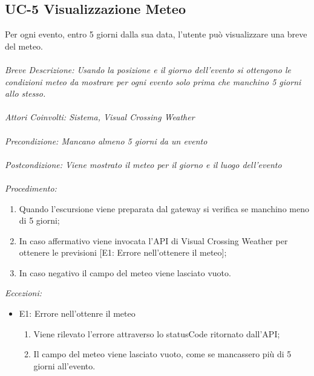 \subsection{UC-5 Visualizzazione Meteo}
Per ogni evento, entro 5 giorni dalla sua data, l'utente può visualizzare una breve del meteo.
\\
\\
\textit{Breve Descrizione: Usando la posizione e il giorno dell'evento si ottengono le condizioni meteo da mostrare per ogni evento solo prima che manchino 5 giorni allo stesso.} 
\\
\\
\textit{Attori Coinvolti: Sistema, Visual Crossing Weather}
\\
\\
\textit{Precondizione: Mancano almeno 5 giorni da un evento}
\\
\\
\textit{Postcondizione: Viene mostrato il meteo per il giorno e il luogo dell'evento}
\\
\\
\textit{Procedimento:}
\begin{enumerate}
	\item Quando l'escursione viene preparata dal gateway si verifica se manchino meno di 5 giorni;
	\item In caso affermativo viene invocata l'API di Visual Crossing Weather per ottenere le previsioni [E1: Errore nell'ottenere il meteo];
	\item In caso negativo il campo del meteo viene lasciato vuoto.
\end{enumerate}


\textit{Eccezioni:}
\begin{itemize}
	\item E1: Errore nell'ottenre il meteo
	\begin{enumerate}
		\item Viene rilevato l'errore attraverso lo statusCode ritornato dall'API;
		\item Il campo del meteo viene lasciato vuoto, come se mancassero più di 5 giorni all'evento.
	\end{enumerate}
\end{itemize}